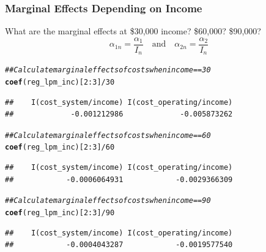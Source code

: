 \documentclass{beamer}\usepackage[]{graphicx}\usepackage[]{xcolor}
\makeatletter
\newcommand{\hlnum}[1]{\textcolor[rgb]{0.686,0.059,0.569}{#1}}%
\newcommand{\hlcom}[1]{\textcolor[rgb]{0.678,0.584,0.686}{\textit{#1}}}%
\newcommand{\hlopt}[1]{\textcolor[rgb]{0,0,0}{#1}}%
\newcommand{\hlstd}[1]{\textcolor[rgb]{0.345,0.345,0.345}{#1}}%
\newcommand{\hlkwd}[1]{\textcolor[rgb]{0.737,0.353,0.396}{\textbf{#1}}}%
\newenvironment{kframe}{%
 \def\at@end@of@kframe{}%
 \ifinner\ifhmode%
  \def\at@end@of@kframe{\end{minipage}}%
  \begin{minipage}{\columnwidth}%
 \fi\fi%
 \def\FrameCommand##1{\hskip\@totalleftmargin \hskip-\fboxsep
 \colorbox{shadecolor}{##1}\hskip-\fboxsep
     \hskip-\linewidth \hskip-\@totalleftmargin \hskip\columnwidth}%
 \MakeFramed {\advance\hsize-\width
   \@totalleftmargin\z@ \linewidth\hsize
   \@setminipage}}%
 {\par\unskip\endMakeFramed%
 \at@end@of@kframe}
\newenvironment{knitrout}{}{} %
\makeatother
\begin{document}
\begin{frame}[fragile]\frametitle{Marginal Effects Depending on Income}
    What are the marginal effects at \$30,000 income? \$60,000? \$90,000?
    $$\alpha_{1n} = \frac{\alpha_1}{I_n} \quad \text{and} \quad \alpha_{2n} = \frac{\alpha_2}{I_n}$$
\begin{knitrout}\footnotesize
{}\color{fgcolor}\begin{kframe}
\begin{alltt}
\hlcom{## Calculate marginal effects of costs when income == 30}
\hlkwd{coef}\hlstd{(reg_lpm_inc)[}\hlnum{2}\hlopt{:}\hlnum{3}\hlstd{]} \hlopt{/} \hlnum{30}
\end{alltt}
\begin{verbatim}
##    I(cost_system/income) I(cost_operating/income) 
##             -0.001212986             -0.005873262
\end{verbatim}
\begin{alltt}
\hlcom{## Calculate marginal effects of costs when income == 60}
\hlkwd{coef}\hlstd{(reg_lpm_inc)[}\hlnum{2}\hlopt{:}\hlnum{3}\hlstd{]} \hlopt{/} \hlnum{60}
\end{alltt}
\begin{verbatim}
##    I(cost_system/income) I(cost_operating/income) 
##            -0.0006064931            -0.0029366309
\end{verbatim}
\begin{alltt}
\hlcom{## Calculate marginal effects of costs when income == 90}
\hlkwd{coef}\hlstd{(reg_lpm_inc)[}\hlnum{2}\hlopt{:}\hlnum{3}\hlstd{]} \hlopt{/} \hlnum{90}
\end{alltt}
\begin{verbatim}
##    I(cost_system/income) I(cost_operating/income) 
##            -0.0004043287            -0.0019577540
\end{verbatim}
\end{kframe}
\end{knitrout}
\end{frame}
\end{document}
